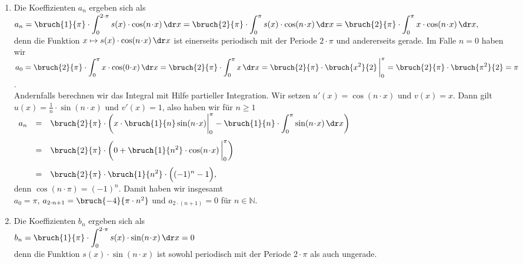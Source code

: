 \begin{enumerate}
\item Die Koeffizienten $a_n$ ergeben sich als 
      \\[0.3cm]
      \hspace*{0.5cm}
      $\displaystyle
        a_n  =  \bruch{1}{\pi} \cdot\int_0^{2\cdot\pi} s(x) \cdot \cos(n\!\cdot\!x)\,\dr x 
             =  \bruch{2}{\pi} \cdot\int_{0}^{\pi} s(x) \cdot \cos(n\!\cdot\!x)\,\dr x
             =  \bruch{2}{\pi} \cdot\int_{0}^{\pi} x \cdot \cos(n\!\cdot\!x)\,\dr x, 
      $
      \\[0.3cm]
      denn die Funktion $x \mapsto s(x) \cdot \cos(n\!\cdot\!x)\,\dr x$ ist einerseits
      periodisch mit der Periode $2\cdot\pi$ und andererseits gerade.
      Im Falle $n=0$ haben wir 
      \\[0.1cm]
      \hspace*{1.3cm}
        $\displaystyle a_0 = \bruch{2}{\pi} \cdot\int_{0}^{\pi} x \cdot \cos(0\!\cdot\!x)\,\dr x =
          \bruch{2}{\pi} \cdot\int_{0}^{\pi} x \,\dr x = 
          \bruch{2}{\pi} \cdot \bruch{x^2}{2} \,\bigg|_0^\pi = \bruch{2}{\pi} \cdot \bruch{\pi^2}{2} =\pi$.
      \\[0.1cm]
      Andernfalls berechnen wir das Integral  mit Hilfe partieller Integration.  Wir setzen
      $u'(x) = \cos(n\!\cdot\!x)$ und $v(x) = x$.  Dann gilt
      $u(x) = \frac{1}{n}\cdot \sin(n\!\cdot\!x)$ und $v'(x) = 1$, also haben wir f\"ur 
      $n \geq 1$
      \\[0.3cm]
      \hspace*{1.3cm}
      $
      \begin{array}[t]{lcl}
         a_n &= &\displaystyle \bruch{2}{\pi} \cdot\left( x \cdot \bruch{1}{n}\sin(n\!\cdot\!x) \bigg|_0^{\pi} - 
               \bruch{1}{n}\cdot \int_0^{\pi} \sin(n\!\cdot\!x)\,\dr x\right) \\[0.5cm]
             &= &\displaystyle \bruch{2}{\pi} \cdot\left(0 + \bruch{1}{n^2} \cdot \cos(n\!\cdot\!x)\, \bigg|_0^\pi\right) \\[0.5cm]
             &= &\displaystyle \bruch{2}{\pi} \cdot\bruch{1}{n^2}\cdot \Bigl( (-1)^n - 1 \Bigr), 
      \end{array}
      $
      \\[0.3cm]
      denn $\cos(n\cdot \pi) = (-1)^n$. Damit haben wir insgesamt
      \\[0.3cm]
      \hspace*{1.3cm}
      $a_0 = \pi$, \quad $a_{2\cdot n+1} = \bruch{-4}{\pi\cdot n^2}$ \quad und \quad $a_{2\cdot(n+1)} = 0$ \quad f\"ur $n\in \mathbb{N}$.
\item Die Koeffizienten $b_n$ ergeben sich als
      \\[0.3cm]
      \hspace*{1.3cm}
      $b_n  = \displaystyle \bruch{1}{\pi} \cdot\int_0^{2\cdot\pi} s(x) \cdot \sin(n\!\cdot\!x)\,\dr x = 0$
      \\[0.3cm]
      denn die Funktion $s(x) \cdot \sin(n\!\cdot\!x)$ ist sowohl periodisch mit der Periode $2\cdot\pi$ als auch ungerade.
\end{enumerate}
